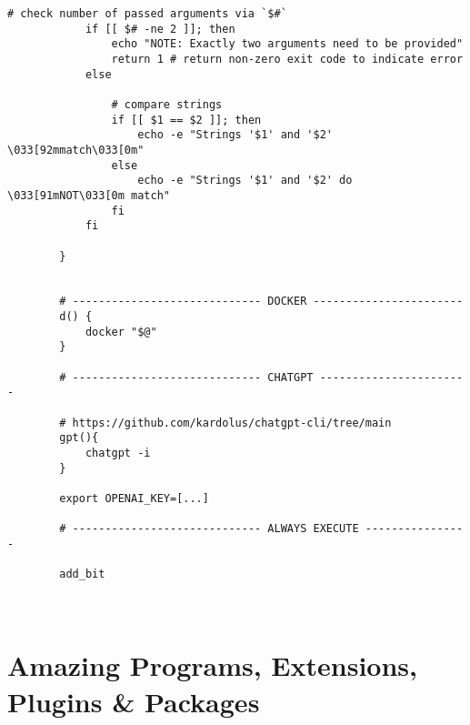 \documentclass[12pt, a4paper]{scrbook}
\numberwithin{equation}{section}
\theoremstyle{definition}
\theoremstyle{definition}
\begin{document}
\begin{lstlisting}[style=mystylebash, label=alg:bashrc_contents, xleftmargin=\parindent]
			# check number of passed arguments via `$#`
			if [[ $# -ne 2 ]]; then
				echo "NOTE: Exactly two arguments need to be provided"
				return 1 # return non-zero exit code to indicate error
			else
			
				# compare strings
				if [[ $1 == $2 ]]; then
					echo -e "Strings '$1' and '$2' \033[92mmatch\033[0m"
				else
					echo -e "Strings '$1' and '$2' do \033[91mNOT\033[0m match"
				fi
			fi
			
		}
		

		# ----------------------------- DOCKER -----------------------
		d() {
			docker "$@"
		}
	
		# ----------------------------- CHATGPT -----------------------

		# https://github.com/kardolus/chatgpt-cli/tree/main
		gpt(){
			chatgpt -i
		}
	
		export OPENAI_KEY=[...]
	
		# ----------------------------- ALWAYS EXECUTE ----------------
		
		add_bit
		
				
	\end{lstlisting}

\chapter{Amazing Programs, Extensions, Plugins \& Packages}
\end{document}
